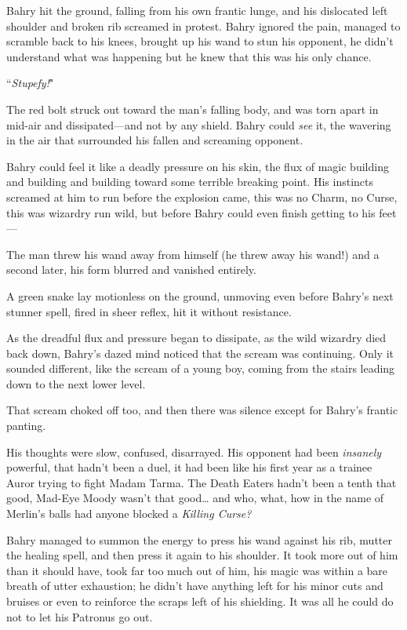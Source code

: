 Bahry hit the ground, falling from his own frantic lunge, and his dislocated left shoulder and broken rib screamed in protest. Bahry ignored the pain, managed to scramble back to his knees, brought up his wand to stun his opponent, he didn't understand what was happening but he knew that this was his only chance.

``\emph{Stupefy!}"

The red bolt struck out toward the man's falling body, and was torn apart in mid-air and dissipated---and not by any shield. Bahry could \emph{see} it, the wavering in the air that surrounded his fallen and screaming opponent.

Bahry could feel it like a deadly pressure on his skin, the flux of magic building and building and building toward some terrible breaking point. His instincts screamed at him to run before the explosion came, this was no Charm, no Curse, this was wizardry run wild, but before Bahry could even finish getting to his feet---

The man threw his wand away from himself (he threw away his wand!) and a second later, his form blurred and vanished entirely.

A green snake lay motionless on the ground, unmoving even before Bahry's next stunner spell, fired in sheer reflex, hit it without resistance.

As the dreadful flux and pressure began to dissipate, as the wild wizardry died back down, Bahry's dazed mind noticed that the scream was continuing. Only it sounded different, like the scream of a young boy, coming from the stairs leading down to the next lower level.

That scream choked off too, and then there was silence except for Bahry's frantic panting.

His thoughts were slow, confused, disarrayed. His opponent had been \emph{insanely} powerful, that hadn't been a duel, it had been like his first year as a trainee Auror trying to fight Madam Tarma. The Death Eaters hadn't been a tenth that good, Mad-Eye Moody wasn't that good{\ldots} and who, what, how in the name of Merlin's balls had anyone blocked a \emph{Killing Curse?}

Bahry managed to summon the energy to press his wand against his rib, mutter the healing spell, and then press it again to his shoulder. It took more out of him than it should have, took far too much out of him, his magic was within a bare breath of utter exhaustion; he didn't have anything left for his minor cuts and bruises or even to reinforce the scraps left of his shielding. It was all he could do not to let his Patronus go out.

